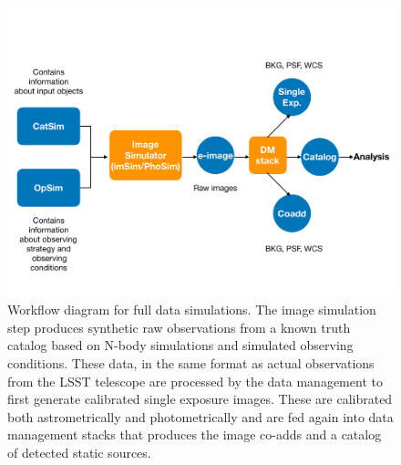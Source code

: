 \documentclass[twocolumn]{aastex62}
\begin{document}
\begin{figure}
\centering
 \includegraphics[trim={0cm 1.25cm 0cm 4.05cm}, clip, width=1.0\columnwidth]{dc1_workflow}
\caption{Workflow diagram for full data simulations. The image simulation step produces synthetic raw observations from a known truth catalog based on N-body simulations and simulated observing conditions. These data, in the same format as actual observations from the LSST telescope are processed by the data management to first generate calibrated single exposure images. These are calibrated both astrometrically and photometrically and are fed again into data management stacks that produces the image co-adds and a catalog of detected static sources. 
}

\label{fig:dc1_workflow}
\end{figure}
\end{document}
